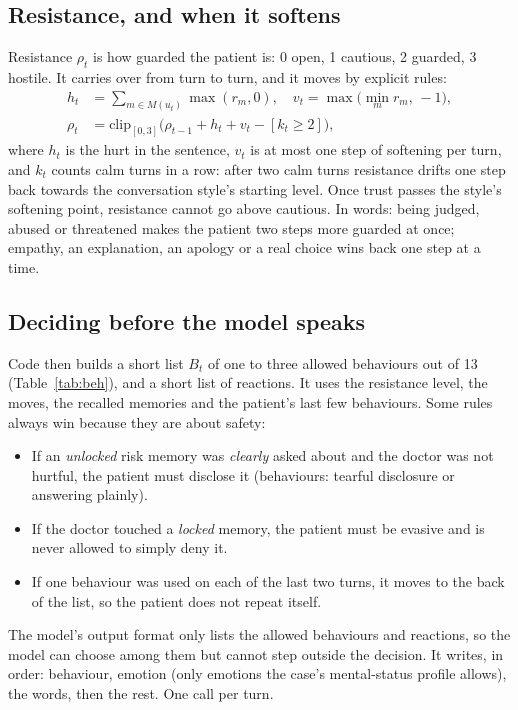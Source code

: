 \documentclass[conference]{IEEEtran}
\begin{document}
\subsection{Resistance, and when it softens}
Resistance $\rho_t$ is how guarded the patient is: 0 open, 1 cautious, 2 guarded, 3 hostile. It carries over from turn to turn, and it moves
by explicit rules:
\begin{align}
h_t &= \textstyle\sum_{m\in M(u_t)}\max(r_m,0),\quad v_t=\max\big(\min_{m} r_m,\,-1\big),\\
\rho_t &= \mathrm{clip}_{[0,3]}\big(\rho_{t-1}+h_t+v_t-[k_t\ge 2]\big),
\end{align}
where $h_t$ is the hurt in the sentence, $v_t$ is at most one step of softening per turn, and $k_t$ counts calm turns in a row: after two
calm turns resistance drifts one step back towards the conversation style's starting level. Once trust passes the style's softening point,
resistance cannot go above cautious. In words: being judged, abused or threatened makes the patient two steps more guarded at once;
empathy, an explanation, an apology or a real choice wins back one step at a time.

\subsection{Deciding before the model speaks}
Code then builds a short list $B_t$ of one to three allowed behaviours out of 13 (Table~\ref{tab:beh}), and a short list of reactions. It uses the resistance level, the moves, the recalled memories and the patient's last few behaviours. Some rules always win because they are about safety:
\begin{itemize}
\item If an \emph{unlocked} risk memory was \emph{clearly} asked about and the doctor was not hurtful, the patient must disclose it
(behaviours: tearful disclosure or answering plainly).
\item If the doctor touched a \emph{locked} memory, the patient must be evasive and is never allowed to simply deny it.
\item If one behaviour was used on each of the last two turns, it moves to the back of the list, so the patient does not repeat itself.
\end{itemize}
The model's output format only lists the allowed behaviours and reactions, so the model can choose among them but cannot step outside the
decision. It writes, in order: behaviour, emotion (only emotions the case's mental-status profile allows), the words, then the rest. One call
per turn.
\end{document}
